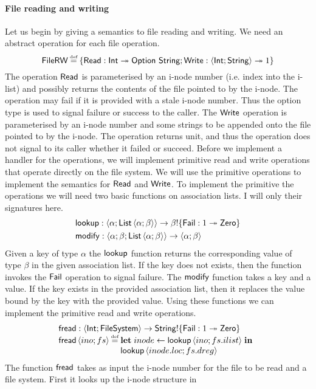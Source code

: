 \documentclass[12pt,phd,lfcs,twoside,openright,logo,leftchapter,normalheadings]{infthesis}
\theoremstyle{plain}
\theoremstyle{definition}
\begin{document}
\paragraph{File reading and writing}
%
Let us begin by giving a semantics to file reading and writing. We
need an abstract operation for each file operation.
%
\[
  \dec{FileRW} \defas \{\URead : \Int \opto \Option~\String;\UWrite : \Record{\Int;\String} \opto \UnitType\}
\]
%
The operation $\mathsf{Read}$ is parameterised by an i-node number
(i.e. index into the i-list) and possibly returns the contents of the
file pointed to by the i-node. The operation may fail if it is
provided with a stale i-node number. Thus the option type is used to
signal failure or success to the caller.
%
The $\mathsf{Write}$ operation is parameterised by an i-node number and some
strings to be appended onto the file pointed to by the i-node. The
operation returns unit, and thus the operation does not signal to its
caller whether it failed or succeed.
%
Before we implement a handler for the operations, we will implement
primitive read and write operations that operate directly on the file
system. We will use the primitive operations to implement the
semantics for $\mathsf{Read}$ and $\mathsf{Write}$. To implement the primitive the
operations we will need two basic functions on association lists. I
will only their signatures here.
%
\[
  \bl
    \lookup : \Record{\alpha;\List\,\Record{\alpha;\beta}} \to \beta \eff \{\Fail : \UnitType \opto \Zero\} \smallskip\\
    \modify : \Record{\alpha;\beta;\List\,\Record{\alpha;\beta}} \to \Record{\alpha;\beta}
  \el
\]
%
Given a key of type $\alpha$ the $\mathsf{lookup}$ function returns the
corresponding value of type $\beta$ in the given association list. If
the key does not exists, then the function invokes the $\mathsf{Fail}$
operation to signal failure.
%
The $\mathsf{modify}$ function takes a key and a value. If the key exists in
the provided association list, then it replaces the value bound by the
key with the provided value.
%
Using these functions we can implement the primitive read and write
operations.
%
\[
  \bl
    \fread : \Record{\Int;\FileSystem} \to \String \eff \{\Fail : \UnitType \opto \Zero\}\\
    \fread\,\Record{ino;fs} \defas
      \ba[t]{@{}l}
        \Let\;inode \revto \lookup\,\Record{ino; fs.ilist}\;\In\\
        \lookup\,\Record{inode.loc; fs.dreg}
      \el
  \el
\]
%
The function $\mathsf{fread}$ takes as input the i-node number for the file to
be read and a file system. First it looks up the i-node structure in
\end{document}
